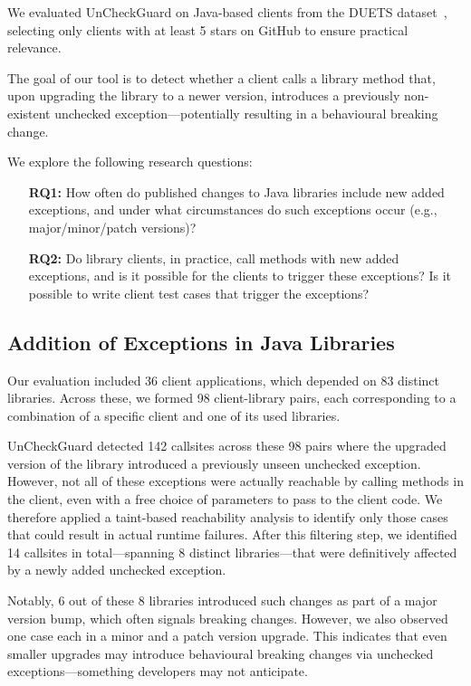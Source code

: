 We evaluated UnCheckGuard on Java-based clients from the DUETS dataset~\cite{durieux21:_duets}, selecting only clients with at least 5 stars on GitHub to ensure practical relevance.

The goal of our tool is to detect whether a client calls a library method that, upon upgrading the library to a newer version, introduces a previously non-existent unchecked exception—potentially resulting in a behavioural breaking change.

We explore the following research questions:

\begin{itemize}
  \item[\textbf{RQ1:}] How often do published changes to Java libraries include new added exceptions, and under what circumstances do such exceptions occur (e.g., major/minor/patch versions)?
  \item[\textbf{RQ2:}] Do library clients, in practice, call methods with new added exceptions, and is it possible for the clients to trigger these exceptions? Is it possible to write client test cases that trigger the exceptions?
\end{itemize}

\subsection{Addition of Exceptions in Java Libraries}

Our evaluation included 36 client applications, which depended on 83 distinct libraries. Across these, we formed 98 client-library pairs, each corresponding to a combination of a specific client and one of its used libraries. 

UnCheckGuard detected 142 callsites across these 98 pairs where the upgraded version of the library introduced a previously unseen unchecked exception. However, not all of these exceptions were actually reachable by calling methods in the client, even with a free choice of parameters to pass to the client code. We therefore applied a taint-based reachability analysis to identify only those cases that could result in actual runtime failures. After this filtering step, we identified 14 callsites in total—spanning 8 distinct libraries—that were definitively affected by a newly added unchecked exception. 

Notably, 6 out of these 8 libraries introduced such changes as part of a major version bump, which often signals breaking changes. However, we also observed one case each in a minor and a patch version upgrade. This indicates that even smaller upgrades may introduce behavioural breaking changes via unchecked exceptions—something developers may not anticipate.


